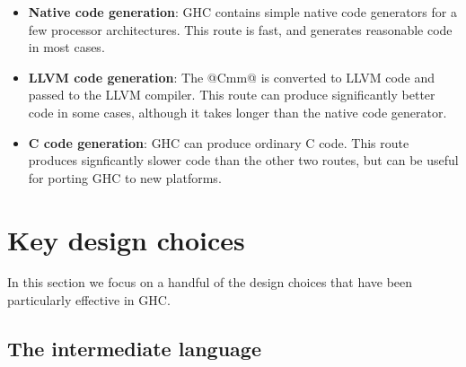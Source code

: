 \documentclass{article}
\begin{document}
\begin{itemize}
\item \textbf{Native code generation}: GHC contains simple native code
  generators for a few processor architectures.  This route is fast,
  and generates reasonable code in most cases.

\item \textbf{LLVM code generation}: The @Cmm@ is converted to LLVM
  code and passed to the LLVM compiler.  This route can produce
  significantly better code in some cases, although it takes longer
  than the native code generator.

\item \textbf{C code generation}: GHC can produce ordinary C code.
  This route produces signficantly slower code than the other two
  routes, but can be useful for porting GHC to new platforms.
\end{itemize}

\section{Key design choices}

In this section we focus on a handful of the design choices that have
been particularly effective in GHC.

\subsection{The intermediate language}
\label{s:core}
\end{document}
